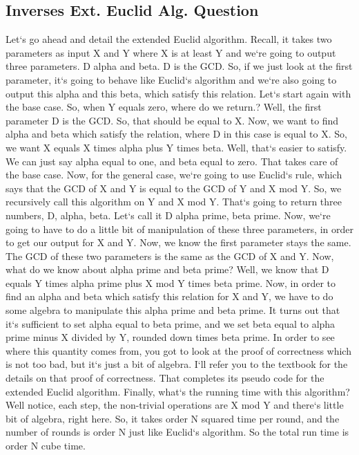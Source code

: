 \subsection{Inverses  Ext.
Euclid Alg.
Question}
Let`s go ahead and detail the extended Euclid algorithm.
Recall, it takes two parameters as input X and Y where X is at least Y and we`re going to output three parameters.
D alpha and beta.
D is the GCD\@.
So, if we just look at the first parameter, it`s going to behave like Euclid`s algorithm and we`re also going to output this alpha and this beta, which satisfy this relation.
Let`s start again with the base case.
So, when Y equals zero, where do we return.? Well, the first parameter D is the GCD\@.
So, that should be equal to X\@.
Now, we want to find alpha and beta which satisfy the relation, where D in this case is equal to X\@.
So, we want X equals X times alpha plus Y times beta.
Well, that`s easier to satisfy.
We can just say alpha equal to one, and beta equal to zero.
That takes care of the base case.
Now, for the general case, we`re going to use Euclid`s rule, which says that the GCD of X and Y is equal to the GCD of Y and X mod Y\@.
So, we recursively call this algorithm on Y and X mod Y\@.
That`s going to return three numbers, D, alpha, beta.
Let`s call it D alpha prime, beta prime.
Now, we`re going to have to do a little bit of manipulation of these three parameters, in order to get our output for X and Y\@.
Now, we know the first parameter stays the same.
The GCD of these two parameters is the same as the GCD of X and Y\@.
Now, what do we know about alpha prime and beta prime? Well, we know that D equals Y times alpha prime plus X mod Y times beta prime.
Now, in order to find an alpha and beta which satisfy this relation for X and Y, we have to do some algebra to manipulate this alpha prime and beta prime.
It turns out that it`s sufficient to set alpha equal to beta prime, and we set beta equal to alpha prime minus X divided by Y, rounded down times beta prime.
In order to see where this quantity comes from, you got to look at the proof of correctness which is not too bad, but it`s just a bit of algebra.
I`ll refer you to the textbook for the details on that proof of correctness.
That completes its pseudo code for the extended Euclid algorithm.
Finally, what`s the running time with this algorithm? Well notice, each step, the non-trivial operations are X mod Y and there`s little bit of algebra, right here.
So, it takes order N squared time per round, and the number of rounds is order N just like Euclid`s algorithm.
So the total run time is order N cube time.

